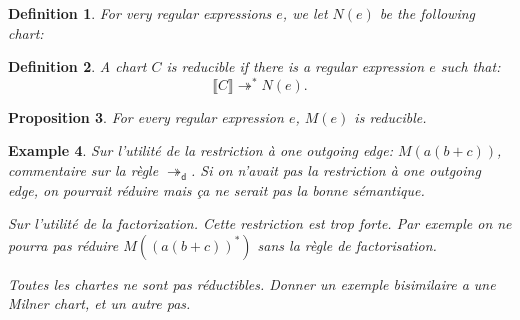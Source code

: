 \documentclass{article}
\newtheorem{definition}{Definition}[section]
\newtheorem{proposition}[definition]{Proposition}
\newtheorem{example}[definition]{Example}
\begin{document}
\begin{definition}
For very regular expressions $e$, we let ${N}(e)$ be the following chart:
\begin{center}
    \end{center}
\end{definition}

\begin{definition}
    A chart $C$ is \emph{reducible} if there is a regular expression $e$ such that:
     $$\llbracket C\rrbracket \twoheadrightarrow^* N(e).$$

\end{definition}


\begin{proposition} For every regular expression $e$, $M(e)$ is reducible.
    ~\label{prop:Milner-is-reducible}
\end{proposition}

\begin{example}
    Sur l'utilité de la restriction à one outgoing edge: $M(a(b+c))$, commentaire sur la règle $\twoheadrightarrow_{\mathsf{d}}$.
     Si on n'avait pas la restriction à one outgoing edge, on pourrait réduire mais ça ne serait pas 
     la bonne sémantique.

    Sur l'utilité de la factorization. Cette restriction est trop forte. Par exemple on ne pourra pas
    réduire $M((a(b+c))^*)$ sans la règle de factorisation.

    Toutes les chartes ne sont pas réductibles. Donner un exemple bisimilaire a une Milner chart, et un autre pas.
\end{example}



\end{document}
